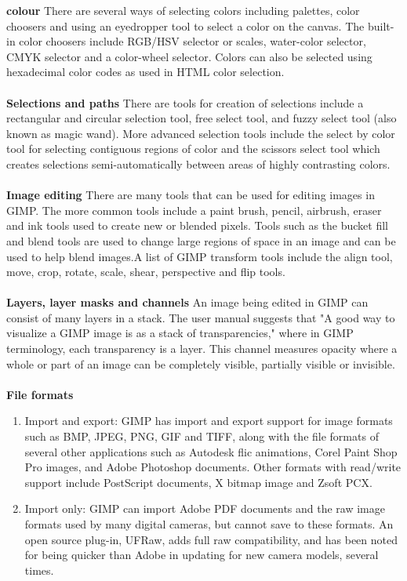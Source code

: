 \textbf{colour}
There are several ways of selecting colors including palettes, color choosers and using an eyedropper tool to select a color on the canvas. The built-in color choosers include RGB/HSV selector or scales, water-color selector, CMYK selector and a color-wheel selector. Colors can also be selected using hexadecimal color codes as used in HTML color selection. \\\\
\textbf{Selections and paths}
There are tools for creation of selections include a rectangular and circular selection tool, free select tool, and fuzzy select tool (also known as magic wand). More advanced selection tools include the select by color tool for selecting contiguous regions of color and the scissors select tool which creates selections semi-automatically between areas of highly contrasting colors.\\\\
\textbf{Image editing}
There are many tools that can be used for editing images in GIMP. The more common tools include a paint brush, pencil, airbrush, eraser and ink tools used to create new or blended pixels. Tools such as the bucket fill and blend tools are used to change large regions of space in an image and can be used to help blend images.A list of GIMP transform tools include the align tool, move, crop, rotate, scale, shear, perspective and flip tools.\\\\
\textbf{Layers, layer masks and channels}
An image being edited in GIMP can consist of many layers in a stack. The user manual suggests that "A good way to visualize a GIMP image is as a stack of transparencies," where in GIMP terminology, each transparency is a layer. This channel measures opacity where a whole or part of an image can be completely visible, partially visible or invisible.\\\\
\textbf{File formats}
\begin{enumerate}
\item Import and export: GIMP has import and export support for image formats such as BMP, JPEG, PNG, GIF and TIFF, along with the file formats of several other applications such as Autodesk flic animations, Corel Paint Shop Pro images, and Adobe Photoshop documents. Other formats with read/write support include PostScript documents, X bitmap image and Zsoft PCX. \item Import only: GIMP can import Adobe PDF documents and the raw image formats used by many digital cameras, but cannot save to these formats. An open source plug-in, UFRaw, adds full raw compatibility, and has been noted for being quicker than Adobe in updating for new camera models, several times.
\end{enumerate}

